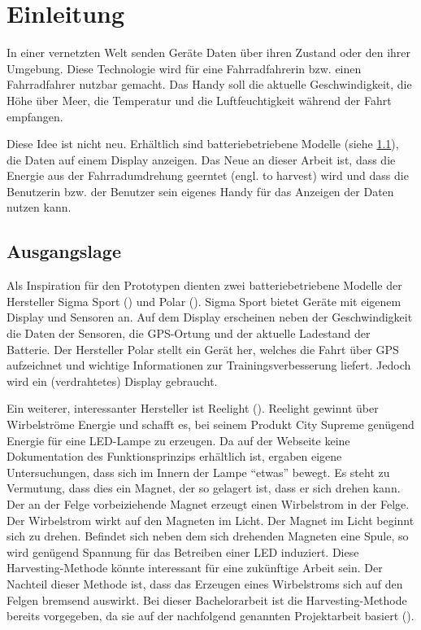 \chapter{Einleitung}

In einer vernetzten Welt senden Geräte Daten über ihren Zustand oder den ihrer Umgebung. Diese Technologie wird für eine Fahrradfahrerin bzw. einen Fahrradfahrer nutzbar gemacht. Das Handy soll die aktuelle Geschwindigkeit, die Höhe über Meer, die Temperatur und die Luftfeuchtigkeit während der Fahrt empfangen.

Diese Idee ist nicht neu. Erhältlich sind batteriebetriebene Modelle (siehe \ref{ausgang}), die Daten auf einem Display anzeigen. Das Neue an dieser Arbeit ist, dass die Energie aus der Fahrradumdrehung geerntet (engl. to harvest) wird und dass die Benutzerin bzw. der Benutzer sein eigenes Handy für das Anzeigen der Daten nutzen kann.


\section{Ausgangslage}
\label{ausgang}

Als Inspiration für den Prototypen dienten zwei batteriebetriebene Modelle der Hersteller Sigma Sport (\cite{SigmaSport}) und Polar (\cite{PolarElectro}). Sigma Sport bietet Geräte mit eigenem Display und  Sensoren an. Auf dem Display erscheinen neben der Geschwindigkeit die Daten der Sensoren, die GPS-Ortung und der aktuelle Ladestand der Batterie. Der Hersteller Polar stellt ein Gerät her, welches die Fahrt über GPS aufzeichnet und wichtige Informationen zur Trainingsverbesserung liefert. Jedoch wird ein (verdrahtetes) Display gebraucht.

Ein weiterer, interessanter Hersteller ist Reelight  (\cite{Reelight}). Reelight gewinnt über Wirbelströme Energie und schafft es, bei seinem Produkt City Supreme genügend Energie für eine LED-Lampe zu erzeugen. Da auf der Webseite keine Dokumentation des Funktionsprinzips erhältlich ist, ergaben eigene Untersuchungen, dass sich im Innern der Lampe ``etwas'' bewegt. Es steht zu Vermutung, dass dies ein Magnet, der so gelagert ist, dass er sich drehen kann. Der an der Felge vorbeiziehende Magnet erzeugt einen Wirbelstrom in der Felge. Der Wirbelstrom wirkt auf den Magneten im Licht. Der Magnet im Licht beginnt sich zu drehen. Befindet sich neben dem sich drehenden Magneten eine Spule, so wird genügend Spannung für das Betreiben einer LED induziert. Diese Harvesting-Methode könnte interessant für eine zukünftige Arbeit sein. Der Nachteil dieser Methode ist, dass das Erzeugen eines Wirbelstroms sich auf den Felgen bremsend auswirkt.  Bei dieser Bachelorarbeit ist die Harvesting-Methode bereits vorgegeben, da sie auf der nachfolgend genannten Projektarbeit basiert (\cite{PA_bicycle}).


